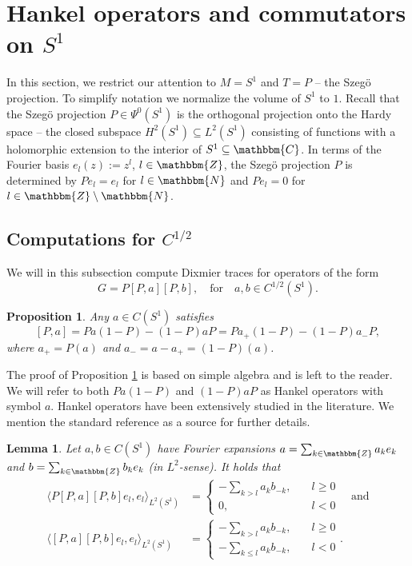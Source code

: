 \documentclass[10pt]{amsart}
\newtheorem{lem}[thm]{Lemma}
\newtheorem{prop}[thm]{Proposition}
\theoremstyle{remark}
\theoremstyle{definition}
\begin{document}
\large
\section{Hankel operators and commutators on $S^1$}
\label{hankelsection}
\normalsize

In this section, we restrict our attention to $M=S^1$ and $T=P$ -- the Szeg\"o projection. To simplify notation we normalize the volume of $S^1$ to $1$. Recall that the Szeg\"o projection $P\in \Psi^0(S^1)$ is the orthogonal projection onto the Hardy space -- the closed subspace  $H^2(S^1)\subseteq L^2(S^1)$ consisting of functions with a holomorphic extension to the interior of $S^1\subseteq {\mathbbm{C}}$. In terms of the Fourier basis $e_l(z):=z^l$, $l\in {\mathbbm{Z}}$, the Szeg\"o projection $P$ is determined by $Pe_l=e_l$ for $l\in {\mathbbm{N}}$ and $Pe_l=0$ for $l\in {\mathbbm{Z}}\setminus {\mathbbm{N}}$. 

\subsection{Computations for $C^{1/2}$} 
\label{hankelsubsection}
We will in this subsection compute Dixmier traces for operators of the form
$$G=P[P,a][P,b],\quad\mbox{for}\quad a,b\in C^{1/2}(S^1).$$

\begin{prop}
\label{hankelcomp}
Any $a\in C(S^1)$ satisfies
$$[P,a]=Pa(1-P)-(1-P)aP=Pa_+(1-P)-(1-P)a_-P,$$
where $a_+=P(a)$ and $a_-=a-a_+=(1-P)(a)$.
\end{prop}

The proof of Proposition \ref{hankelcomp} is based on simple algebra and is left to the reader. We will refer to both $Pa(1-P)$ and $(1-P)aP$ as Hankel operators with symbol $a$. Hankel operators have been extensively studied in the literature. We mention the standard reference \cite{peller} as a source for further details.

\begin{lem}
\label{henkeldixcomp}
Let $a,b\in C(S^1)$ have Fourier expansions $a= \sum_{k\in {\mathbbm{Z}}} a_ke_k$ and $b= \sum_{k\in {\mathbbm{Z}}} b_ke_k$ (in $L^2$-sense).
It holds that
\begin{align}
\label{pcommab}
\langle P[P,a][P,b]e_l,e_l\rangle_{L^2(S^1)}&=
\begin{cases}
-\sum_{k>l} a_{k}b_{-k},\quad &l\geq 0\\
0, \quad &l<0
\end{cases}\quad\mbox{and}\\
\label{commab}
\langle [P,a][P,b]e_l,e_l\rangle_{L^2(S^1)}&=
\begin{cases}
-\sum_{k>l} a_{k}b_{-k},\quad &l\geq 0\\
-\sum_{k\leq l} a_{k}b_{-k}, \quad &l<0
\end{cases}.
\end{align}
\end{lem}
\end{document}
